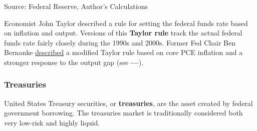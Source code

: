 \documentclass{report}
\makeatletter
\newcommand{\tbllink}[1]{\href{https://raw.githubusercontent.com/bdecon/US-chartbook/master/chartbook/data/#1}{\faTable}}
\newcommand*\short[1]{\expandafter\@gobbletwo\number\numexpr#1\relax}
\newcommand{\absnode}[3]{\node[below right, align=left] at (axis cs: #1,#2) {#3};}
\newcommand{\dateaxisticks}{
		date coordinates in=x, axis line style={draw=none},
		xmax={2024-01-31},
		max space between ticks=40,	    
		xtick={{1990-01-01}, {1992-01-01}, {1994-01-01}, 
			{1996-01-01}, {1998-01-01}, {2000-01-01}, 
			{2002-01-01}, {2004-01-01}, {2006-01-01},
			{2008-01-01}, {2010-01-01}, {2012-01-01}, {2014-01-01},
		    {2016-01-01}, {2018-01-01}, {2020-01-01}, {2022-01-01}, 
		    {2024-01-01}, {2026-01-01}},
		minor xtick={{1989-01-01}, {1991-01-01}, {1993-01-01},
			{1995-01-01}, {1997-01-01}, {1999-01-01}, 
			{2001-01-01}, {2003-01-01}, {2005-01-01}, {2007-01-01},
		    {2009-01-01}, {2011-01-01}, {2013-01-01}, {2015-01-01},
		    {2017-01-01}, {2019-01-01}, {2021-01-01}, {2023-01-01}, 
		    {2025-01-01}, {2027-01-01}},
		enlarge y limits={0.06}, enlarge x limits={0.01},
		xticklabel style={align=center, yshift=-2pt}, tick label style={inner sep=0pt},
		}
\newcommand{\bbar}[2]{extra #1 ticks = {{#2}}, extra #1 tick labels = ,
		extra #1 tick style = {grid=major, grid style={thick, black!25}},}
\newcommand{\stdline}[4]{\addplot[very thick, no markers, color=#1] 
		table [x=#2, y=#3, col sep=comma] {#4};	}
\newcommand{\thickline}[4]{\addplot[ultra thick, no markers, color=#1] 
		table [x=#2, y=#3, col sep=comma] {#4};	}
\newcommand{\rbars}{
		\fill[color=black!10] (axis cs:{1990-07-01},\pgfkeysvalueof{/pgfplots/ymin})
			rectangle (axis cs:{1991-03-01}, \pgfkeysvalueof{/pgfplots/ymax});
		\fill[color=black!10] (axis cs:{2007-12-01},\pgfkeysvalueof{/pgfplots/ymin})
			rectangle (axis cs:{2009-07-01}, \pgfkeysvalueof{/pgfplots/ymax});
		\fill[color=black!10] (axis cs:{2001-03-01},\pgfkeysvalueof{/pgfplots/ymin})
			rectangle (axis cs:{2001-11-01}, \pgfkeysvalueof{/pgfplots/ymax});
		\fill[color=black!10] (axis cs:{2020-02-01},\pgfkeysvalueof{/pgfplots/ymin})
			rectangle (axis cs:{2020-05-01}, \pgfkeysvalueof{/pgfplots/ymax});}
\makeatother
\begin{document}
{\begin{minipage}{1.0\textwidth}
\hspace{2mm} 

\footnotesize{Source: Federal Reserve, Author's Calculations} \hfill \tbllink{rates.csv}
\vspace{2mm}

\small Economist John Taylor described a rule for setting the federal funds rate based on inflation and output. Versions of this \textbf{Taylor rule} track the actual federal funds rate fairly closely during the 1990s and 2000s. Former Fed Chair Ben Bernanke \href{https://www.brookings.edu/blog/ben-bernanke/2015/04/28/the-taylor-rule-a-benchmark-for-monetary-policy/}{described} a modified Taylor rule based on core PCE inflation and a stronger response to the output gap (see {\color{cyan!80!white}\textbf{---}}). 
\end{minipage}
\newpage
\begin{minipage}{1.0\textwidth}
\subsubsection*{Treasuries}
\small United States Treasury securities, or \textbf{treasuries}, are the asset created by federal government borrowing. The treasuries market is traditionally considered both very low-risk and highly liquid. 


\end{minipage}}
\end{document}
